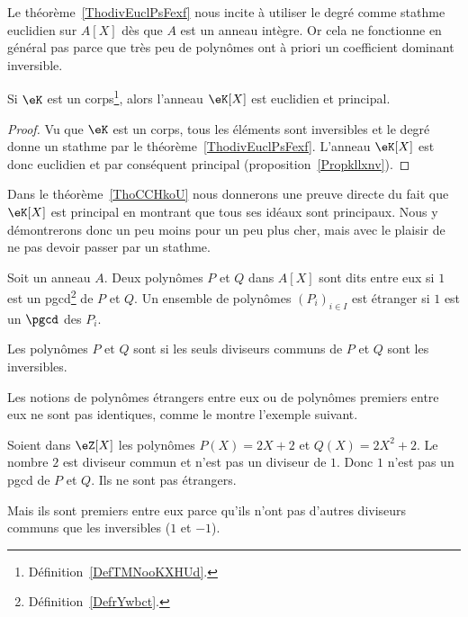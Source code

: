 \begin{normaltext}
    Le théorème~\ref{ThodivEuclPsFexf} nous incite à utiliser le degré comme stathme euclidien sur \( A[X]\) dès que \( A\) est un anneau intègre. Or cela ne fonctionne en général pas parce que très peu de polynômes ont à priori un coefficient dominant inversible.
\end{normaltext}

\begin{lemma}       \label{LEMooIDSKooQfkeKp}
    Si \( \eK\) est un corps\footnote{Définition~\ref{DefTMNooKXHUd}.}, alors l'anneau \( \eK[X]\) est euclidien et principal.
\end{lemma}

\begin{proof}
    Vu que \( \eK\) est un corps, tous les éléments sont inversibles et le degré donne un stathme par le théorème~\ref{ThodivEuclPsFexf}. L'anneau \( \eK[X]\) est donc euclidien et par conséquent principal (proposition~\ref{Propkllxnv}).
\end{proof}

Dans le théorème~\ref{ThoCCHkoU} nous donnerons une preuve directe du fait que \( \eK[X]\) est principal en montrant que tous ses idéaux sont principaux. Nous y démontrerons donc un peu moins pour un peu plus cher, mais avec le plaisir de ne pas devoir passer par un stathme.

\begin{definition}  \label{DefDSFooZVbNAX}
    Soit un anneau \( A\). Deux polynômes \( P\) et \( Q\) dans \( A[X]\) sont dits  entre eux si \( 1\) est un pgcd\footnote{Définition~\ref{DefrYwbct}.} de \( P\) et \( Q\). Un ensemble de polynômes \( (P_i)_{i\in I}\) est étranger  si \( 1\) est un \( \pgcd\) des \( P_i\).

Les polynômes \( P\) et \( Q\) sont  si les seuls diviseurs communs de \( P\) et \( Q\) sont les inversibles.
\end{definition}

Les notions de polynômes étrangers entre eux ou de polynômes premiers entre eux ne sont pas identiques, comme le montre l'exemple suivant.

\begin{example}
    Soient dans \( \eZ[X]\) les polynômes \( P(X)=2X+2\) et \( Q(X)=2X^2+2\). Le nombre \( 2\) est diviseur commun et n'est pas un diviseur de \( 1\). Donc \( 1\) n'est pas un pgcd de \( P\) et \( Q\). Ils ne sont pas étrangers.

    Mais ils sont premiers entre eux parce qu'ils n'ont pas d'autres diviseurs communs que les inversibles (\( 1\) et \( -1\)).
\end{example}

